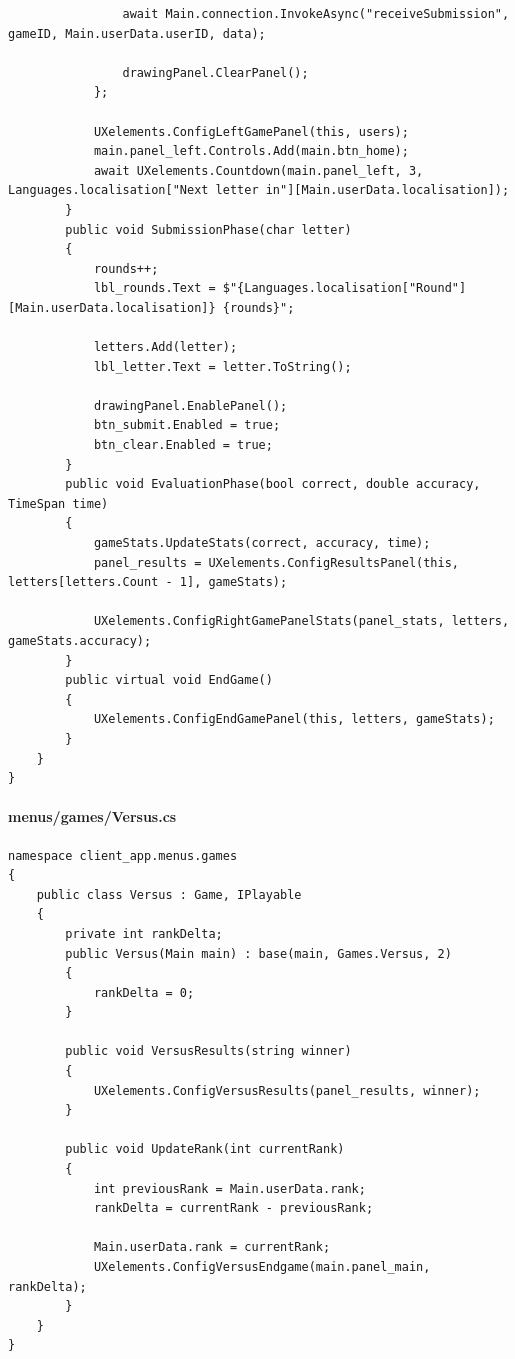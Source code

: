 \documentclass{article}
\begin{document}
\begin{verbatim}
				await Main.connection.InvokeAsync("receiveSubmission", gameID, Main.userData.userID, data);

				drawingPanel.ClearPanel();
			};

			UXelements.ConfigLeftGamePanel(this, users);
			main.panel_left.Controls.Add(main.btn_home);
			await UXelements.Countdown(main.panel_left, 3, Languages.localisation["Next letter in"][Main.userData.localisation]);
		}
		public void SubmissionPhase(char letter)
		{
			rounds++;
			lbl_rounds.Text = $"{Languages.localisation["Round"][Main.userData.localisation]} {rounds}";

			letters.Add(letter);
			lbl_letter.Text = letter.ToString();

			drawingPanel.EnablePanel();
			btn_submit.Enabled = true;
			btn_clear.Enabled = true;
		}
		public void EvaluationPhase(bool correct, double accuracy, TimeSpan time)
		{
			gameStats.UpdateStats(correct, accuracy, time);
			panel_results = UXelements.ConfigResultsPanel(this, letters[letters.Count - 1], gameStats);

			UXelements.ConfigRightGamePanelStats(panel_stats, letters, gameStats.accuracy);
		}
		public virtual void EndGame()
		{
			UXelements.ConfigEndGamePanel(this, letters, gameStats);
		}
	}
}
\end{verbatim}
\paragraph{menus/games/Versus.cs}\label{client/menus/games/versus.cs}
\begin{verbatim}
namespace client_app.menus.games
{
	public class Versus : Game, IPlayable
	{
		private int rankDelta;
		public Versus(Main main) : base(main, Games.Versus, 2)
		{
			rankDelta = 0;
		}

		public void VersusResults(string winner)
		{
			UXelements.ConfigVersusResults(panel_results, winner);
		}

		public void UpdateRank(int currentRank)
		{
			int previousRank = Main.userData.rank;
			rankDelta = currentRank - previousRank;

			Main.userData.rank = currentRank;
			UXelements.ConfigVersusEndgame(main.panel_main, rankDelta);
		}
	}
}
\end{verbatim}
\end{document}
